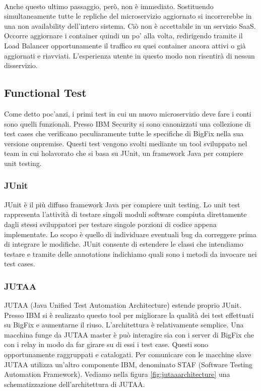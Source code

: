 \paragraph{}
Anche questo ultimo passaggio, però, non è immediato. Sostituendo simultaneamente tutte le repliche del microservizio aggiornato si incorrerebbe in una non availability dell'intero sistema. Ciò non è accettabile in un servizio SaaS. Occorre aggiornare i container quindi un po' alla volta, redirigendo tramite il Load Balancer opportunamente il traffico su quei container ancora attivi o già aggiornati e riavviati. L'esperienza utente in questo modo non risentirà di nessun disservizio.
\subsection{Functional Test}
Come detto poc'anzi, i primi test in cui un nuovo microservizio deve fare i conti sono quelli funzionali. Presso IBM Security si sono canonizzati una collezione di test cases che verificano peculiaramente tutte le specifiche di BigFix nella sua versione onpremise. Questi test vengono svolti mediante un tool sviluppato nel team in cui holavorato che si basa su JUnit, un framework Java per compiere unit testing.
\subsubsection{JUnit}
JUnit è il più diffuso framework Java per compiere unit testing. Lo unit test rappresenta l'attività di testare singoli moduli software compiuta direttamente dagli stessi sviluppatori per testare singole porzioni di codice appena implementate. Lo scopo è quello di individuare eventuali bug da correggere prima di integrare le modifiche. JUnit consente di estendere le classi che intendiamo testare e tramite delle annotations indichiamo quali sono i metodi da invocare nei test cases.
\subsubsection{JUTAA}
JUTAA (Java Unified Test Automation Architecture) estende proprio JUnit. Presso IBM si è realizzato questo tool per migliorare la qualità dei test effettuati su BigFix e aumentarne il riuso. L'architettura è relativamente semplice. Una macchina funge da JUTAA master è può interagire sia con i server di BigFix che con i relay in modo da far girare su di essi i test case. Questi sono opportunamente raggruppati e catalogati. Per comunicare con le macchine slave JUTAA utilizza un'altro componente IBM, denominato STAF (Software Testing Automation Framework). Vediamo nella figura \ref{fig:jutaaarchitecture} una schematizzazione dell'architettura di JUTAA.
